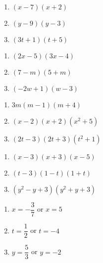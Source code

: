 \documentclass{ximera}
\begin{document}
\begin{multicols}{3}
\begin{enumerate}
\setcounter{enumi}{\value{HW}}

\item $(x-7)(x+2)$
\item $(y-9)(y-3)$
\item $(3t+1)(t+5)$


\setcounter{HW}{\value{enumi}}
\end{enumerate}
\end{multicols}


\begin{multicols}{3}
\begin{enumerate}
\setcounter{enumi}{\value{HW}}

\item $(2x-5)(3x-4)$
\item $(7-m)(5+m)$
\item $(-2w+1)(w-3)$



\setcounter{HW}{\value{enumi}}
\end{enumerate}
\end{multicols}


\begin{multicols}{3}
\begin{enumerate}
\setcounter{enumi}{\value{HW}}

\item $3m(m-1)(m+4)$
\item $(x-2)(x+2)(x^2+5)$
\item $(2t-3)(2t+3)(t^2+1)$


\setcounter{HW}{\value{enumi}}
\end{enumerate}
\end{multicols}

\begin{multicols}{3}
\begin{enumerate}
\setcounter{enumi}{\value{HW}}

\item $(x-3)(x+3)(x-5)$
\item $(t-3)(1-t)(1+t)$
\item $(y^2-y+3)(y^2+y+3)$


\setcounter{HW}{\value{enumi}}
\end{enumerate}
\end{multicols}



\begin{multicols}{3}
\begin{enumerate}
\setcounter{enumi}{\value{HW}}

\item   $x = -\dfrac{3}{7}$ or $x = 5$ 
\item   $t = \dfrac{1}{2}$ or $t = -4$
\item   $y = \dfrac{5}{3}$ or $y = -2$

\setcounter{HW}{\value{enumi}}
\end{enumerate}
\end{multicols}
\end{document}
